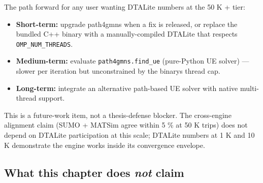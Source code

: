 The path forward for any user wanting DTALite numbers at the 50 K +
tier:

\begin{itemize}
\tightlist
\item
  \textbf{Short-term:} upgrade path4gmns when a fix is released, or
  replace the bundled C++ binary with a manually-compiled DTALite that
  respects \texttt{OMP\_NUM\_THREADS}.
\item
  \textbf{Medium-term:} evaluate \texttt{path4gmns.find\_ue}
  (pure-Python UE solver) --- slower per iteration but unconstrained by
  the binary\textquotesingle s thread cap.
\item
  \textbf{Long-term:} integrate an alternative path-based UE solver with
  native multi-thread support.
\end{itemize}

This is a future-work item, not a thesis-defense blocker. The
cross-engine alignment claim (SUMO + MATSim agree within 5 \% at 50 K
trips) does not depend on DTALite participation at this scale; DTALite
numbers at 1 K and 10 K demonstrate the engine works inside its
convergence envelope.

\subsection{\texorpdfstring{What this chapter does \emph{not}
claim}{What this chapter does not claim}}\label{what-this-chapter-does-not-claim}

